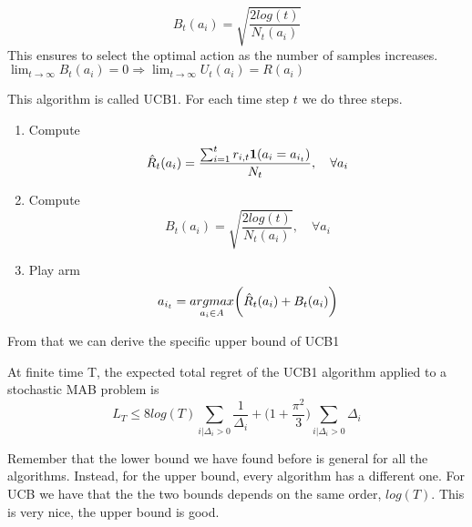\documentclass[main.tex]{subfiles}
\begin{document}
\begin{equation}
    B_t(a_i) = \sqrt{\frac{2log(t)}{N_t(a_i)}}
\end{equation}
This ensures to select the optimal action as the number of samples increases. $\lim_{t \rightarrow \infty} B_t(a_i) = 0 \Rightarrow \lim_{t \rightarrow \infty} U_t(a_i) = R(a_i)$
\par \noindent
This algorithm is called UCB1. For each time step $t$ we do three steps.
\begin{enumerate}
    \item Compute
\begin{equation*}
    \Hat{R}_t(a_i) = \frac{\sum_{i=1}^t r_{i,t} \mathbf{1}(a_i=a_{i_t})}{N_t}, \quad \forall a_i
\end{equation*}
    \item Compute
\begin{equation*}
    B_t(a_i) = \sqrt{\frac{2log(t)}{N_t(a_i)}}, \quad \forall a_i
\end{equation*}
    \item Play arm
\begin{equation*}
    a_{i_t} = \underset{a_i \in A}{argmax}\bigg( \Hat{R}_t(a_i) + B_t(a_i) \bigg)
\end{equation*}
\end{enumerate}
From that we can derive the specific upper bound of UCB1
\begin{theorem}
At finite time T, the expected total regret of the UCB1 algorithm applied to a
stochastic MAB problem is
\begin{equation*}
    L_T \leq 8log(T) \sum_{i|\Delta_i > 0} \frac{1}{\Delta_i} + \bigg( 1+ \frac{\pi^2}{3} \bigg) \sum_{i|\Delta_i > 0} \Delta_i
\end{equation*}
\end{theorem}
\par \noindent
Remember that the lower bound we have found before is general for all the algorithms. Instead, for the upper bound, every algorithm has a different one. For UCB we have that the the two bounds depends on the same order, $log(T)$. This is very nice, the upper bound is good.
\end{document}
